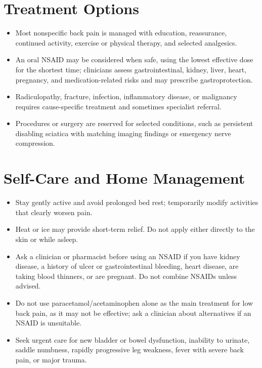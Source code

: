 \section*{Treatment Options}
\begin{itemize}
 \item Most nonspecific back pain is managed with education, reassurance, continued activity, exercise or physical therapy, and selected analgesics.
 \item An oral NSAID may be considered when safe, using the lowest effective dose for the shortest time; clinicians assess gastrointestinal, kidney, liver, heart, pregnancy, and medication-related risks and may prescribe gastroprotection.
 \item Radiculopathy, fracture, infection, inflammatory disease, or malignancy requires cause-specific treatment and sometimes specialist referral.
 \item Procedures or surgery are reserved for selected conditions, such as persistent disabling sciatica with matching imaging findings or emergency nerve compression.
\end{itemize}

\section*{Self-Care and Home Management}
\begin{itemize}
 \item Stay gently active and avoid prolonged bed rest; temporarily modify activities that clearly worsen pain.
 \item Heat or ice may provide short-term relief. Do not apply either directly to the skin or while asleep.
 \item Ask a clinician or pharmacist before using an NSAID if you have kidney disease, a history of ulcer or gastrointestinal bleeding, heart disease, are taking blood thinners, or are pregnant. Do not combine NSAIDs unless advised.
 \item Do not use paracetamol/acetaminophen alone as the main treatment for low back pain, as it may not be effective; ask a clinician about alternatives if an NSAID is unsuitable.
 \item Seek urgent care for new bladder or bowel dysfunction, inability to urinate, saddle numbness, rapidly progressive leg weakness, fever with severe back pain, or major trauma.
\end{itemize}

